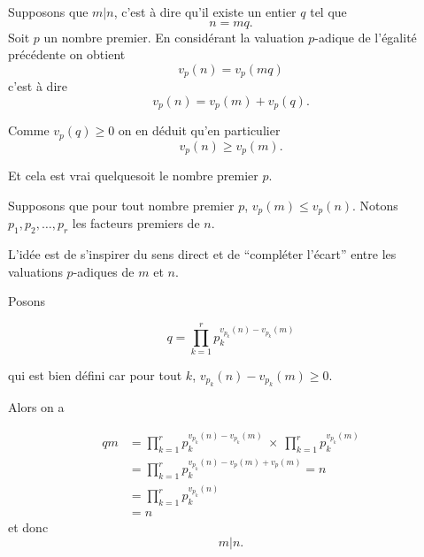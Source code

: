 \begin{sol}
    \framebox{$\Rightarrow$} Supposons que $m | n$, c'est à dire qu'il existe un entier $q$ tel que
    \[n = m q.\]
    Soit $p$ un nombre premier. En considérant la valuation $p$-adique de l'égalité précédente on obtient
    \[v_p(n) = v_p(m q)\]
    c'est à dire
    \[v_p(n) = v_p(m) + v_p( q).\]

    Comme $v_p(q) \geq 0$ on en déduit qu'en particulier
    \[v_p(n) \geq v_p(m).\]

    Et cela est vrai quelquesoit le nombre premier $p$.

    \framebox{$\Leftarrow$} Supposons que pour tout nombre premier $p$,
    $v_p(m) \leq v_p(n)$. Notons $p_1, p_2, \ldots, p_r$ les facteurs premiers de $n$.

    L'idée est de s'inspirer du sens direct et de ``compléter l'écart'' entre les valuations $p$-adiques de $m$ et $n$.

    Posons

    \[q = \prod_{k=1}^r p_k^{v_{p_k}(n)-v_{p_k}(m)}\]

    qui est bien défini car pour tout $k$, $v_{p_k}(n)-v_{p_k}(m) \geq 0$.

    Alors on a

    \[\begin{aligned}
            q m & = \prod_{k=1}^r p_k^{v_{p_k}(n)-v_{p_k}(m)} ~ \times ~\prod_{k=1}^r p_k^{v_{p_k}(m)} \\
                & = \prod_{k=1}^r p_k^{v_{p_k}(n)-v_p(m)+v_p(m)} = n                                   \\
                & = \prod_{k=1}^r p_k^{v_{p_k}(n)}                                                     \\
                & = n
        \end{aligned}\]
    et donc
    \[m | n.\]
\end{sol}

